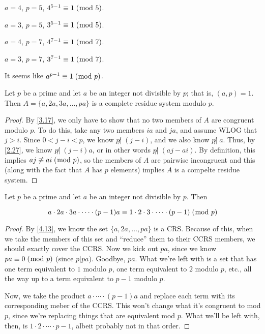 \documentclass[../main.tex]{subfiles}
\begin{document}
$a = 4$, $p = 5$, $4^{5-1} \equiv 1 \; (\bmod \; 5)$.

$a = 3$, $p = 5$, $3^{5-1} \equiv 1 \; (\bmod \; 5)$.

$a = 4$, $p = 7$, $4^{7-1} \equiv 1 \; (\bmod \; 7)$.

$a = 3$, $p = 7$, $3^{7-1} \equiv 1 \; (\bmod \; 7)$.

It seems like $a^{p-1} \equiv 1 \; (\bmod \; p)$.



\begin{thm} \label{4.13}
  Let $p$ be a prime and let $a$ be an integer not divisible by $p$; that is, $(a, p) = 1$. Then $A = \{a, 2a, 3a, \ldots, pa\}$ is a complete residue system modulo $p$.
\end{thm}

\begin{proof}
  By \ref{3.17}, we only have to show that no two members of $A$ are congruent modulo $p$. To do this, take any two members $ia$ and $ja$, and assume WLOG that $j > i$. Since $0 < j - i < p$, we know $p \not | \; (j-i)$, and we also know $p \not | \; a$. Thus, by \ref{2.27}, we know $p \not | \; (j-i)a$, or in other words $p \not | \; (aj - ai)$.
  By definition, this implies $aj \not \equiv ai \; (\bmod \; p)$, so the members of $A$ are pairwise incongruent and this (along with the fact that $A$ has $p$ elements) implies $A$ is a compelte residue system.
\end{proof}



\begin{thm} \label{4.14}
  Let $p$ be a prime and let $a$ be an integer not divisible by $p$. Then

  $$a \cdot 2a \cdot 3a \cdot \cdots \cdot (p-1)a \equiv 1 \cdot 2 \cdot 3 \cdot \cdots \cdot (p-1) \; (\bmod \; p)$$
\end{thm}

\begin{proof}
  By \ref{4.13}, we know the set $\{a, 2a, \ldots, pa\}$ is a CRS. Because of this, when we take the members of this set and ``reduce'' them to their CCRS members, we should exactly cover the CCRS. Now we kick out $pa$, since we know $pa \equiv 0 \; (\bmod \; p)$ (since $p | pa$). Goodbye, $pa$. What we're left with is a set that has one term equivalent to $1$ modulo $p$, one term equivalent to $2$ modulo $p$, etc., all the way up to a term equivalent to $p-1$ modulo $p$.

  Now, we take the product $a \cdot \cdots \cdot (p-1)a$ and replace each term with its corresponding meber of the CCRS. This won't change what it's congruent to mod $p$, since we're replacing things that are equivalent mod $p$. What we'll be left with, then, is $1 \cdot 2 \cdot \cdots \cdot p-1$, albeit probably not in that order.
\end{proof}
\end{document}
